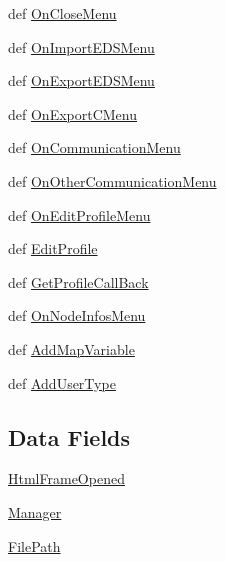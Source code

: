 \begin{CompactItemize}
\item 
def \hyperlink{classobjdictedit_1_1objdictedit_a4c7476aa37450fef74c824201044c3b}{On\-Close\-Menu}
\item 
def \hyperlink{classobjdictedit_1_1objdictedit_8382d1464dd6a162f97040adc166251e}{On\-Import\-EDSMenu}
\item 
def \hyperlink{classobjdictedit_1_1objdictedit_29636fcd3f8f738404b6b99f93f04490}{On\-Export\-EDSMenu}
\item 
def \hyperlink{classobjdictedit_1_1objdictedit_bf3d84bab96fcc04254a602c33fbbbee}{On\-Export\-CMenu}
\item 
def \hyperlink{classobjdictedit_1_1objdictedit_e1addc8fb2f5922f54e3e7805ed5d33e}{On\-Communication\-Menu}
\item 
def \hyperlink{classobjdictedit_1_1objdictedit_01f0b410972b6c480f6eac6448aca0e6}{On\-Other\-Communication\-Menu}
\item 
def \hyperlink{classobjdictedit_1_1objdictedit_e807650522769539794ab076713098e2}{On\-Edit\-Profile\-Menu}
\item 
def \hyperlink{classobjdictedit_1_1objdictedit_0c0a3c1a47120a21ae3d4080c644ea0f}{Edit\-Profile}
\item 
def \hyperlink{classobjdictedit_1_1objdictedit_5c7d639d93865513d3d469703fe19816}{Get\-Profile\-Call\-Back}
\item 
def \hyperlink{classobjdictedit_1_1objdictedit_3bc819e548d22a2487aa70a0f3e6cbb4}{On\-Node\-Infos\-Menu}
\item 
def \hyperlink{classobjdictedit_1_1objdictedit_d320c07fd4feab969b9454d49ab0ef5a}{Add\-Map\-Variable}
\item 
def \hyperlink{classobjdictedit_1_1objdictedit_704a2250995855aaabdd9e024e98a1ca}{Add\-User\-Type}
\end{CompactItemize}
\subsection*{Data Fields}
\begin{CompactItemize}
\item 
\hyperlink{classobjdictedit_1_1objdictedit_e3ce93c9ed275bf17437c681d5ad9692}{Html\-Frame\-Opened}
\item 
\hyperlink{classobjdictedit_1_1objdictedit_6ccd1cd8d15a57827a655e8e556550aa}{Manager}
\item 
\hyperlink{classobjdictedit_1_1objdictedit_d412cf4192d971441e15328fe07d0836}{File\-Path}
\end{CompactItemize}
